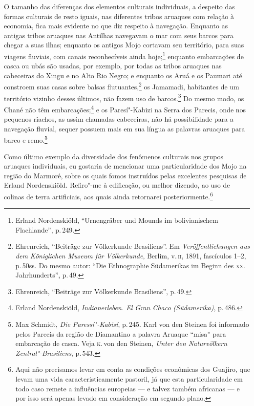 O tamanho das diferenças dos elementos culturais individuais, a
despeito das formas culturais de resto iguais, nas diferentes tribos
aruaques com relação à economia, fica mais evidente no que diz respeito
à navegação. Enquanto as antigas tribos aruaques nas Antilhas navegavam
o mar com seus barcos para chegar a suas ilhas; enquanto os antigos Mojo
cortavam seu território, para suas viagens fluviais, com canais
reconhecíveis ainda hoje;\footnote{Erland Nordenskiöld, ``Urnengräber
  und Mounds im bolivianischem Flachlande'', p.\,249.} enquanto
embarcações de casca ou ubás são usadas, por exemplo, por todas as
tribos aruaques nas cabeceiras do Xingu e no Alto Rio Negro; e enquanto
os Aruá e os Paumari até constroem suas casas sobre balsas
flutuantes,\footnote{Ehrenreich, ``Beiträge zur Völkerkunde Brasiliens''.
  Em \textit{Veröffentlichungen aus dem Königlichen Museum für
  Völkerkunde}, Berlim, v.\,\textsc{ii}, 1891, fascículos 1--2, p.\,50ss. Do mesmo
  autor: ``Die Ethnographie Südamerikas im Beginn des \textsc{xx}.
  Jahrhunderts'', p.\,49.} os Jamamadi, habitantes de um
território vizinho desses últimos, não fazem uso de barcos.\footnote{Ehrenreich,
  ``Beiträge zur Völkerkunde Brasiliens'', p.\,49.} Do mesmo
modo, os Chané não têm embarcações;\footnote{Erland Nordenskiöld,
  \textit{Indianerleben. El Gran Chaco (Südamerika)}, p.\,486.} e os
Paresí"-Kabizi na Serra dos Parecis, onde nos pequenos riachos, as assim
chamadas cabeceiras, não há possibilidade para a navegação fluvial,
sequer possuem mais em sua língua as palavras aruaques para barco e
remo.\footnote{Max Schmidt, \textit{Die Paressí"-Kabisí}, p.\,245. Karl
  von den Steinen foi informado pelos Parecis da região de Diamantino a
  palavra Aruaque ``misa'' para embarcação de casca. Veja \textsc{k}.\,von den
  Steinen, \textit{Unter den Naturvölkern Zentral"-Brasiliens}, p.\,543.}

Como último exemplo da diversidade dos fenômenos culturais nos grupos
aruaques individuais, eu gostaria de mencionar uma particularidade dos
Mojo na região do Marmoré, sobre os quais fomos instruídos pelas
excelentes pesquisas de Erland Nordenskiöld. Refiro"-me à edificação, ou
melhor dizendo, ao uso de colinas de terra artificiais, aos quais ainda
retornarei posteriormente.\footnote{Aqui não precisamos levar em conta as
condições econômicas dos Guajiro, que levam uma vida
caracteristicamente pastoril, já que esta particularidade em todo caso
remete a influências europeias --- e talvez também africanas --- e por
isso será apenas levado em consideração em segundo plano.}

